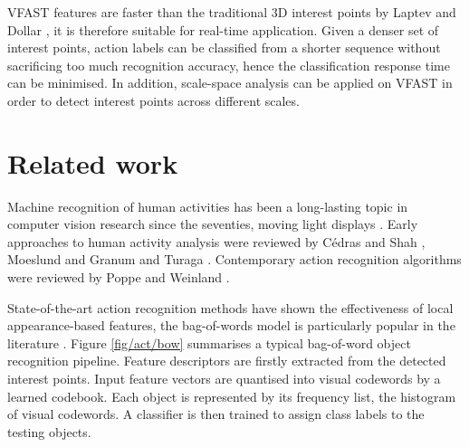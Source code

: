 VFAST features are faster than the traditional 3D interest points by Laptev \cite{Laptev2005} and Dollar \etal \cite{Dollar2005}, it is therefore suitable for real-time application. 
Given a denser set of interest points, action labels can be classified from a shorter sequence without sacrificing too much recognition accuracy, hence the classification response time can be minimised. 
In addition, scale-space analysis can be applied on VFAST in order to detect interest points across different scales.



\section{Related work}
\label{sec/act/relatedwork}

Machine recognition of human activities has been a long-lasting topic in computer vision research since the seventies, \eg moving light displays \cite{Johansson1973}. Early approaches to human activity analysis were reviewed by C\'edras and Shah \cite{Cedras1995}, Moeslund and Granum \cite{Moeslund2001} and Turaga \etal \cite{Turaga2008}. Contemporary action recognition algorithms were reviewed by Poppe \cite{Poppe2010} and Weinland \etal \cite{Weinland2011}.   

State-of-the-art action recognition methods have shown the effectiveness of local appearance-based features, the bag-of-words model is particularly popular in the literature \cite{Schuldt2004, Dollar2005, Riemenschneider2009, Niebles2008, Wong2007}.
Figure \ref{fig/act/bow} summarises a typical bag-of-word object recognition pipeline. Feature descriptors are firstly extracted from the detected interest points. Input feature vectors are quantised into visual codewords by a learned codebook. Each object is represented by its frequency list, \ie the histogram of visual codewords. A classifier is then trained to assign class labels to the testing objects.


